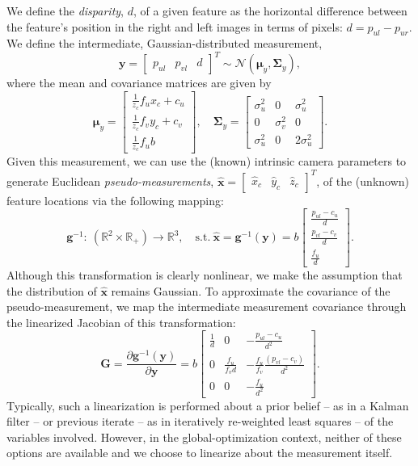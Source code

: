 \documentclass[lettersize,journal]{IEEEtran}
\begin{document}
We define the \textit{disparity}, $ d $, of a given feature as the horizontal difference between the feature's position in the right and left images in terms of pixels: $ d = p_{ul} - p_{ur} $. We define the intermediate, Gaussian-distributed measurement, 
\begin{equation}
	\bm{y} = \begin{bmatrix}p_{ul}&p_{vl}&d\end{bmatrix}^T \sim \mathcal{N}(\bm{\mu}_y, \bm{\Sigma}_y),
\end{equation}
where the mean and covariance matrices are given by
\begin{equation}
	\bm{\mu}_y = \begin{bmatrix}
		\frac{1}{z_c}f_u x_c + c_u \\ \frac{1}{z_c}f_v y_c + c_v \\ \frac{1}{z_c}f_u b
	\end{bmatrix},\quad \bm{\Sigma}_y = \begin{bmatrix}
		\sigma_u^2 & 0 & \sigma_u^2\\
		0 & \sigma_v^2 & 0 \\
		\sigma_u^2 & 0 & 2\sigma_u^2
	\end{bmatrix}.
\end{equation}
Given this measurement, we can use the (known) intrinsic camera parameters to generate Euclidean \textit{pseudo-measurements}, $ \hat{\bm{x}} = \begin{bmatrix}\hat{x}_c &\hat{y}_c & \hat{z}_c \end{bmatrix}^T $, of the (unknown) feature locations via the following mapping:
\begin{equation}
	\bm{g}^{-1}:~(\mathbb{R}^2\times\mathbb{R}_+) \rightarrow \mathbb{R}^3, \quad \mbox{s.t.}~\hat{\bm{x}} = \bm{g}^{-1}(\bm{y})=b\begin{bmatrix}
	 	\frac{p_{ul}-c_u}{d} \\ \frac{p_{vl}-c_v}{d} \\ \frac{f_u}{d} 
	 \end{bmatrix}.
\end{equation}
Although this transformation is clearly nonlinear, we make the assumption that the distribution of $ \hat{\bm{x}} $ remains Gaussian. To approximate the covariance of the pseudo-measurement, we map the intermediate measurement covariance through the linearized Jacobian of this transformation:
\begin{equation}
	\bm{G} = \frac{\partial \bm{g}^{-1}(\bm{y})}{\partial \bm{y}} = b\begin{bmatrix}
		\frac{1}{d} & 0 & -\frac{p_{ul} - c_u}{d^2} \\
		0 & \frac{f_u}{f_v d} & -\frac{f_u}{f_v }\frac{(p_{vl} - c_v)}{d^2} \\
		0 & 0 & -\frac{f_u}{d^2}
	\end{bmatrix}.
\end{equation}
Typically, such a linearization is performed about a prior belief -- as in a Kalman filter -- or previous iterate -- as in iteratively re-weighted least squares --  of the variables involved. However, in the global-optimization context, neither of these options are available and we choose to linearize about the measurement itself. 
\end{document}
